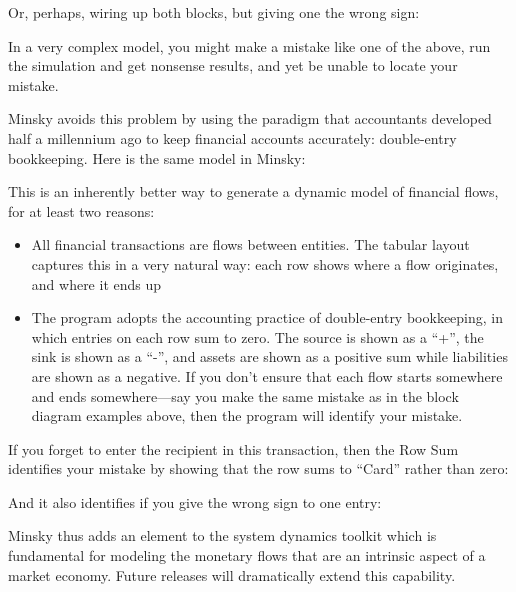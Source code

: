 Or, perhaps, wiring up both blocks, but giving one the wrong sign:

\begin{center}
\end{center}

In a very complex model, you might make a mistake like one of the above, run the simulation and get nonsense results, and yet be unable to locate your mistake.


Minsky avoids this problem by using the paradigm that accountants
developed half a millennium ago to keep financial accounts accurately:
double-entry bookkeeping. Here is the same model in Minsky:

\begin{center}
\end{center}

This is an inherently better way to generate a dynamic model of financial flows, for at least two reasons:
\begin{itemize}
\item All financial transactions are flows between entities. The
  tabular layout captures this in a very natural way: each row shows
  where a flow originates, and where it ends up
\item The program adopts the accounting practice of double-entry
  bookkeeping, in which entries on each row sum to zero. The source is
  shown as a ``+'', the sink is shown as a ``-'', and assets are shown
  as a positive sum while liabilities are shown as a negative. If you
  don't ensure that each flow starts somewhere and ends
  somewhere---say you make the same mistake as in the block diagram
  examples above, then the program will identify your mistake.
\end{itemize}

If you forget to enter the recipient in this transaction, then the Row
Sum identifies your mistake by showing that the row sums to ``Card''
rather than zero:

\begin{center}
\end{center}

And it also identifies if you give the wrong sign to one entry:

\begin{center}
\end{center}

Minsky thus adds an element to the system dynamics toolkit which is
fundamental for modeling the monetary flows that are an intrinsic
aspect of a market economy. Future releases will dramatically extend
this capability. 


